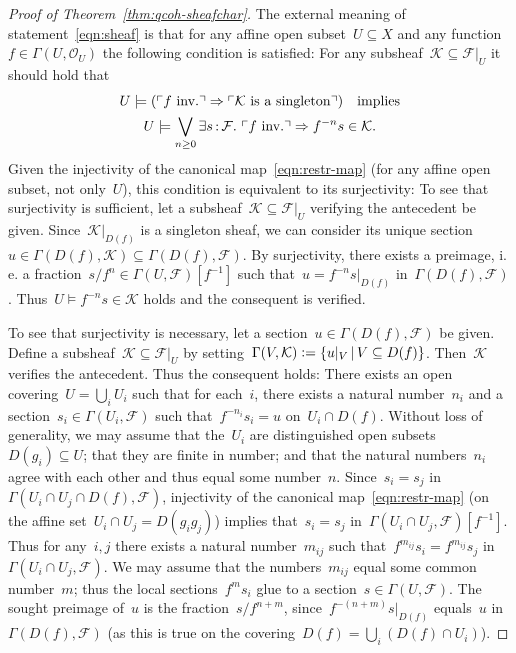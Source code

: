 \documentclass[10pt]{amsart}
\makeatletter
\theoremstyle{definition}
\theoremstyle{plain}
\theoremstyle{remark}
\newcommand{\F}{\mathcal{F}}
\renewcommand{\O}{\mathcal{O}}
\newcommand{\K}{\mathcal{K}}
\newcommand{\?}{\,{:}\,}
\renewcommand{\_}{\mathpunct{.}\,}
\newcommand{\speak}[1]{\ulcorner\text{\textnormal{#1}}\urcorner}
\newcommand{\ie}{i.\,e.\@\xspace}
\newcommand{\inv}{inv.\@}
\newcommand{\defeq}{\vcentcolon=}
\makeatother
\begin{document}
\begin{proof}[Proof of Theorem~\ref{thm:qcoh-sheafchar}]
The external meaning of statement~\eqref{eqn:sheaf} is that for any affine open
subset~$U \subseteq X$ and any function~$f \in \Gamma(U,\O_U)$ the following
condition is satisfied: For any subsheaf~$\K \subseteq \F|_U$ it should hold
that
\begin{multline*}
  U \models (\speak{$f$ \inv} \Rightarrow \speak{$\K$ is a singleton})
  \quad\text{implies} \\
  U \models \bigvee_{n \geq 0} \exists s\?\F\_
  \speak{$f$ \inv} \Rightarrow f^{-n} s \in \K.
\end{multline*}
Given the injectivity of the canonical map~\eqref{eqn:restr-map} (for any
affine open subset, not only~$U$), this condition is equivalent to its
surjectivity: To see that surjectivity is sufficient, let a subsheaf~$\K
\subseteq \F|_U$ verifying the antecedent be given. Since~$\K|_{D(f)}$ is a
singleton sheaf, we can consider its unique section~$u \in \Gamma(D(f),\K)
\subseteq \Gamma(D(f),\F)$. By surjectivity, there exists a preimage, \ie a
fraction~$s/f^n \in \Gamma(U,\F)[f^{-1}]$ such that~$u = f^{-n} s|_{D(f)}$
in~$\Gamma(D(f),\F)$. Thus~$U \models f^{-n}s \in \K$ holds and the consequent
is verified.

To see that surjectivity is necessary, let a section~$u \in \Gamma(D(f),\F)$ be
given. Define a subsheaf~$\K \subseteq \F|_U$ by setting~$\Gamma(V,\K) \defeq \{
u|_V \,|\, V \subseteq D(f) \}$. Then~$\K$ verifies the antecedent. Thus the
consequent holds: There exists an open covering~$U = \bigcup_i U_i$ such that
for each~$i$, there exists a natural number~$n_i$ and a section~$s_i \in
\Gamma(U_i,\F)$ such that~$f^{-n_i} s_i = u$ on~$U_i \cap D(f)$. Without loss of
generality, we may assume that the~$U_i$ are distinguished open subsets~$D(g_i)
\subseteq U$; that they are finite in number; and that the natural
numbers~$n_i$ agree with each other and thus equal some number~$n$. Since~$s_i
= s_j$ in~$\Gamma(U_i \cap U_j \cap D(f), \F)$, injectivity of the canonical
map~\eqref{eqn:restr-map} (on the affine set~$U_i \cap U_j = D(g_i g_j)$)
implies that~$s_i = s_j$ in~$\Gamma(U_i \cap U_j, \F)[f^{-1}]$. Thus for
any~$i,j$ there exists a natural number~$m_{ij}$ such that~$f^{m_{ij}} s_i =
f^{m_{ij}} s_j$ in~$\Gamma(U_i \cap U_j, \F)$. We may assume that the
numbers~$m_{ij}$ equal some common number~$m$; thus the local sections~$f^m s_i$
glue to a section~$s \in \Gamma(U,\F)$. The sought preimage of~$u$ is the
fraction~$s/f^{n+m}$, since~$f^{-(n+m)} s|_{D(f)}$ equals~$u$
in~$\Gamma(D(f),\F)$ (as this is true on the covering~$D(f) = \bigcup_i (D(f)
\cap U_i)$).
\end{proof}
\end{document}
